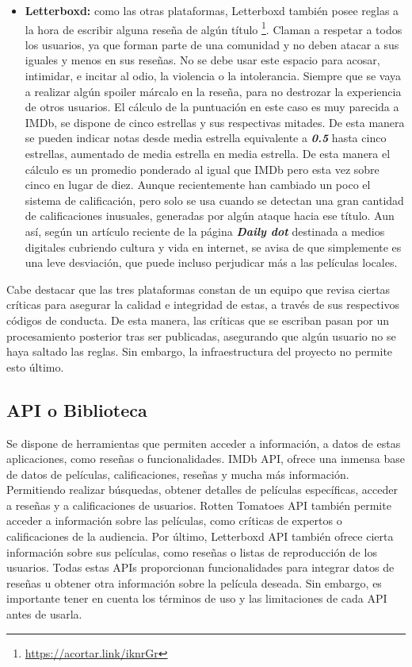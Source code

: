 \begin{itemize}
\item \textbf{Letterboxd:} como las otras plataformas, Letterboxd también posee reglas a la hora de escribir alguna reseña de algún título \footnote{\url{https://acortar.link/iknrGr}}. Claman a respetar a todos los usuarios, ya que forman parte de una comunidad y no deben atacar a sus iguales y menos en sus reseñas. No se debe usar este espacio para acosar, intimidar, e incitar al odio, la violencia o la intolerancia. Siempre que se vaya a realizar algún spoiler márcalo en la reseña, para no destrozar la experiencia de otros usuarios. El cálculo de la puntuación en este caso es muy parecida a IMDb, se dispone de cinco estrellas y sus respectivas mitades. De esta manera se pueden indicar notas desde media estrella equivalente a \textbf{\textit{0.5}} hasta cinco estrellas, aumentado de media estrella en media estrella. De esta manera el cálculo es un promedio ponderado al igual que IMDb pero esta vez sobre cinco en lugar de diez. Aunque recientemente han cambiado un poco el sistema de calificación, pero solo se usa cuando se detectan una gran cantidad de calificaciones inusuales, generadas por algún ataque hacia ese título. Aun así, según un artículo \cite{CRletterboxd} reciente de la página \textbf{\textit{Daily dot}} destinada a medios digitales cubriendo cultura y vida en internet, se avisa de que simplemente es una leve desviación, que puede incluso perjudicar más a las películas locales.
\end{itemize}

Cabe destacar que las tres plataformas constan de un equipo que revisa ciertas críticas para asegurar la calidad e integridad de estas, a través de sus respectivos códigos de conducta. De esta manera, las críticas que se escriban pasan por un procesamiento posterior tras ser publicadas, asegurando que algún usuario no se haya saltado las reglas. Sin embargo, la infraestructura del proyecto no permite esto último.

\subsection{API o Biblioteca}

Se dispone de herramientas que permiten acceder a información, a datos de estas aplicaciones, como 
reseñas o funcionalidades. IMDb API, ofrece una inmensa base de datos de películas, 
calificaciones, reseñas y mucha más información. Permitiendo realizar búsquedas, obtener detalles de 
películas específicas, acceder a reseñas y a calificaciones de usuarios. Rotten Tomatoes API también 
permite acceder a información sobre las películas, como críticas de expertos o calificaciones de la 
audiencia. Por último, Letterboxd API también ofrece cierta información sobre sus películas, como 
reseñas o listas de reproducción de los usuarios. Todas estas APIs proporcionan funcionalidades 
para integrar datos de reseñas u obtener otra información sobre la película deseada. Sin embargo, es 
importante tener en cuenta los términos de uso y las limitaciones de cada API antes de usarla.

